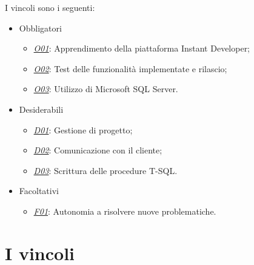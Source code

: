  I vincoli sono i seguenti:
\begin{itemize}
	\item Obbligatori
	\begin{itemize}
		\item \underline{\textit{O01}}: Apprendimento della piattaforma Instant Developer;
		\item \underline{\textit{O02}}: Test delle funzionalità implementate e rilascio;
		\item \underline{\textit{O03}}: Utilizzo di Microsoft SQL Server.
	\end{itemize}
	
	\item Desiderabili 
	\begin{itemize}
		\item \underline{\textit{D01}}: Gestione di progetto;
		\item \underline{\textit{D02}}: Comunicazione con il cliente;
		\item \underline{\textit{D03}}: Scrittura delle procedure T-SQL.
	\end{itemize}
	
	\item Facoltativi
	\begin{itemize}
		\item \underline{\textit{F01}}: Autonomia a risolvere nuove problematiche.
	\end{itemize} 
\end{itemize}


\section{I vincoli}

